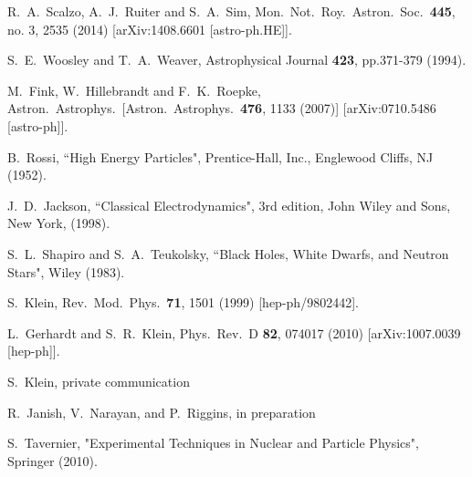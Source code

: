   R.~A.~Scalzo, A.~J.~Ruiter and S.~A.~Sim,
  Mon.\ Not.\ Roy.\ Astron.\ Soc.\  {\bf 445}, no. 3, 2535 (2014)
  [arXiv:1408.6601 [astro-ph.HE]].


  S.~E.~Woosley and T.~A.~Weaver, Astrophysical Journal {\bf 423}, pp.371-379 (1994).

  M.~Fink, W.~Hillebrandt and F.~K.~Roepke,
  Astron.\ Astrophys.\
  [Astron.\ Astrophys.\  {\bf 476}, 1133 (2007)]
  [arXiv:0710.5486 [astro-ph]].


B.~Rossi, ``High Energy Particles", Prentice-Hall, Inc., Englewood Cliffs, NJ (1952).

J.~D.~Jackson, ``Classical Electrodynamics", 3rd edition, John Wiley and Sons, New
York, (1998).

S.~L.~Shapiro and S.~A.~Teukolsky, ``Black Holes, White Dwarfs, and Neutron Stars", Wiley (1983).

  S.~Klein,
  Rev.\ Mod.\ Phys.\  {\bf 71}, 1501 (1999)
  [hep-ph/9802442].

  L.~Gerhardt and S.~R.~Klein,
  Phys.\ Rev.\ D {\bf 82}, 074017 (2010)
  [arXiv:1007.0039 [hep-ph]].

S.~Klein, private communication

R.~Janish, V.~Narayan, and P.~Riggins, in preparation

S.~Tavernier, "Experimental Techniques in Nuclear and Particle Physics", Springer (2010).

